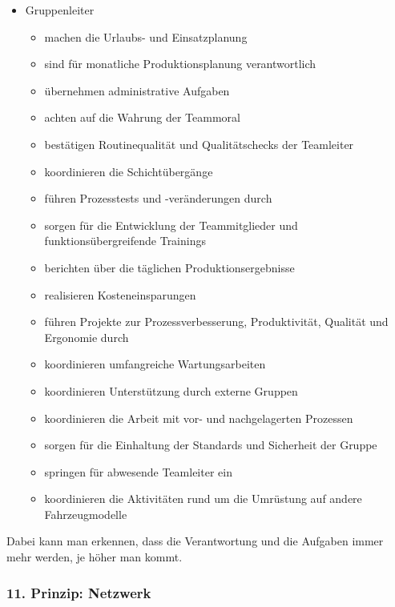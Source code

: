 \documentclass[a4paper,12pt]{scrartcl}
\begin{document}
\begin{itemize}
\begin{itemize}
    \end{itemize}
    \item Gruppenleiter
        \begin{itemize}
        \item machen die Urlaubs- und Einsatzplanung
        \item sind für monatliche Produktionsplanung verantwortlich
        \item übernehmen administrative Aufgaben
        \item achten auf die Wahrung der Teammoral
        \item bestätigen Routinequalität und Qualitätschecks der Teamleiter
        \item koordinieren die Schichtübergänge
        \item führen Prozesstests und -veränderungen durch
        \item sorgen für die Entwicklung der Teammitglieder und funktionsübergreifende Trainings
        \item berichten über die täglichen Produktionsergebnisse
        \item realisieren Kosteneinsparungen
        \item führen Projekte zur Prozessverbesserung, Produktivität, Qualität und Ergonomie durch
        \item koordinieren umfangreiche Wartungsarbeiten
        \item koordinieren Unterstützung durch externe Gruppen
        \item koordinieren die Arbeit mit vor- und nachgelagerten Prozessen
        \item sorgen für die Einhaltung der Standards und Sicherheit der Gruppe
        \item springen für abwesende Teamleiter ein
        \item koordinieren die Aktivitäten rund um die Umrüstung auf andere Fahrzeugmodelle
    \end{itemize}
\end{itemize}

Dabei kann man erkennen, dass die Verantwortung und die Aufgaben immer mehr werden, je höher man kommt. 

\subsubsection{11. Prinzip: Netzwerk}
\end{document}
